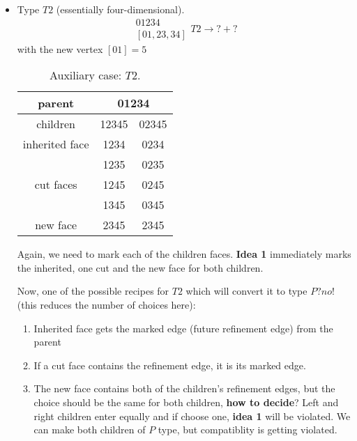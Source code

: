 \documentclass[a4paper,12pt]{amsart}
\numberwithin{equation}{section}
\begin{document}
\begin{itemize}
	\item Type $T2$ (essentially four-dimensional).
	$$ \begin{array}{c} 01234 \\ \left[01,23,34\right] \end{array} T2
	\rightarrow ? + ? $$
	with the new vertex $\left[01\right] = 5$
	\begin{table}[h!]
	\caption{Auxiliary case: $T2$.}
	\label{tab:Case4}
	\begin{tabular}{|c|c|c|} \hline
	parent & \multicolumn{2}{|c|}{01234} \\ \hline
	children & 12345 & 02345 \\ \hline
	inherited face & 1234 & 0234 \\ \hline
	\multirow{3}{*}{cut faces} & 1235 & 0235 \\ 
	 & 1245 & 0245 \\ 
	 & 1345 & 0345 \\ \hline
	 new face & 2345 & 2345 \\ \hline
	\end{tabular}
	\end{table}    
    Again, we need to mark each of the children faces. 
    \textbf{Idea 1} immediately marks the inherited, one cut and the new face for both children. 
    
    Now, one of the possible recipes for $T2$ which will convert it to type $P? no!$ (this reduces the number of choices here):
    	\begin{enumerate}
		\item Inherited face gets the marked edge (future refinement edge) from the parent
		\item If a cut face contains the refinement edge, it is its marked edge.
		\item The new face contains both of the children's refinement edges, but the choice should be the same for both children, \textbf{how to decide}? Left and right children enter equally and if choose one, \textbf{idea 1} will be violated. We can make both children of $P$ type, but compatiblity is getting violated.
		\end{enumerate}	
		

\end{itemize}
\end{document}

